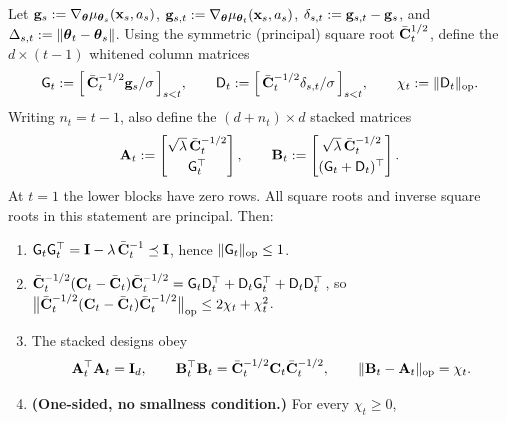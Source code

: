 \begin{lemma}\label{lem:whitened}
Let $\mathbf{g}_s := \nabla_{\boldsymbol{\theta}}\mu_{\boldsymbol{\theta}_s}(\mathbf{x}_s,a_s)$,
$\mathbf{g}_{s,t}:=\nabla_{\boldsymbol{\theta}}\mu_{\boldsymbol{\theta}_t}(\mathbf{x}_s,a_s)$,
$\delta_{s,t}:=\mathbf{g}_{s,t}-\mathbf{g}_s$, and
$\Delta_{s,t}:=\|\boldsymbol{\theta}_t-\boldsymbol{\theta}_s\|$.
Using the symmetric (principal) square root $\bar{\mathbf{C}}_t^{1/2}$, define the
$d\times(t{-}1)$ whitened column matrices
\begin{equation}\label{eq:whitened-cols}
  \mathsf{G}_t := \Bigl[\,\bar{\mathbf{C}}_t^{-1/2}\mathbf{g}_s/\sigma\,\Bigr]_{s<t},
  \qquad
  \mathsf{D}_t := \Bigl[\,\bar{\mathbf{C}}_t^{-1/2}\delta_{s,t}/\sigma\,\Bigr]_{s<t},
  \qquad
  \chi_t := \|\mathsf{D}_t\|_{\mathrm{op}} .
\end{equation}
Writing $n_t=t-1$, also define the $(d+n_t)\times d$ stacked matrices
\begin{equation}\label{eq:stacked-whitened-designs}
 \mathbf{A}_t:=\begin{bmatrix}
  \sqrt\lambda\,\bar{\mathbf{C}}_t^{-1/2}\\[1mm] \mathsf{G}_t^\top
 \end{bmatrix},\qquad
 \mathbf{B}_t:=\begin{bmatrix}
  \sqrt\lambda\,\bar{\mathbf{C}}_t^{-1/2}\\[1mm] (\mathsf{G}_t+\mathsf{D}_t)^\top
 \end{bmatrix}.
\end{equation}
At $t=1$ the lower blocks have zero rows.  All square roots and inverse
square roots in this statement are principal.
Then:
\begin{enumerate}[nosep,label=(\alph*),leftmargin=1.6em]
\item $\mathsf{G}_t\mathsf{G}_t^\top = \mathbf{I} - \lambda\,\bar{\mathbf{C}}_t^{-1} \preceq \mathbf{I}$,
  hence $\|\mathsf{G}_t\|_{\mathrm{op}}\le 1$.
\item $\bar{\mathbf{C}}_t^{-1/2}(\mathbf{C}_t-\bar{\mathbf{C}}_t)\bar{\mathbf{C}}_t^{-1/2}
  = \mathsf{G}_t\mathsf{D}_t^\top + \mathsf{D}_t\mathsf{G}_t^\top + \mathsf{D}_t\mathsf{D}_t^\top$,
  so $\bigl\|\bar{\mathbf{C}}_t^{-1/2}(\mathbf{C}_t-\bar{\mathbf{C}}_t)\bar{\mathbf{C}}_t^{-1/2}\bigr\|_{\mathrm{op}}
  \le 2\chi_t + \chi_t^2$.
\item The stacked designs obey
  \begin{equation}\label{eq:stacked-identities}
   \mathbf{A}_t^\top\mathbf{A}_t=\mathbf{I}_d,\qquad
   \mathbf{B}_t^\top\mathbf{B}_t=
   \bar{\mathbf{C}}_t^{-1/2}\mathbf{C}_t\bar{\mathbf{C}}_t^{-1/2},\qquad
   \|\mathbf{B}_t-\mathbf{A}_t\|_{\rm op}=\chi_t.
  \end{equation}
\item \textbf{(One-sided, no smallness condition.)} For every $\chi_t\ge0$,
  \begin{equation}\label{eq:onesided-C}

\end{equation}
\end{enumerate}
\end{lemma}
